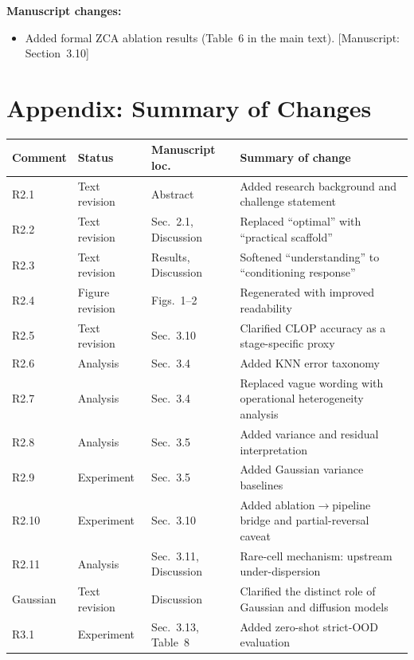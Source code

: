 \documentclass[11pt,letterpaper]{article}
\newcommand{\msref}[1]{\textcolor{blue!60!black}{\textsf{[Manuscript: #1]}}}
\begin{document}
\noindent\textbf{Manuscript changes:}
\begin{itemize}
  \item Added formal ZCA ablation results (Table~6 in the main text). \msref{Section~3.10}
\end{itemize}


\newpage

\section*{Appendix: Summary of Changes}

\small
\begin{longtable}{@{}p{1.6cm}p{2.8cm}p{3.2cm}p{5.5cm}@{}}
\toprule
\textbf{Comment} & \textbf{Status} & \textbf{Manuscript loc.} & \textbf{Summary of change} \\
\midrule
\endhead
R2.1 & Text revision & Abstract & Added research background and challenge statement \\
R2.2 & Text revision & Sec.~2.1, Discussion & Replaced ``optimal'' with ``practical scaffold'' \\
R2.3 & Text revision & Results, Discussion & Softened ``understanding'' to ``conditioning response'' \\
R2.4 & Figure revision & Figs.~1--2 & Regenerated with improved readability \\
R2.5 & Text revision & Sec.~3.10 & Clarified CLOP accuracy as a stage-specific proxy \\
R2.6 & Analysis & Sec.~3.4 & Added KNN error taxonomy \\
R2.7 & Analysis & Sec.~3.4 & Replaced vague wording with operational heterogeneity analysis \\
R2.8 & Analysis & Sec.~3.5 & Added variance and residual interpretation \\
R2.9 & Experiment & Sec.~3.5 & Added Gaussian variance baselines \\
R2.10 & Experiment & Sec.~3.10 & Added ablation$\to$pipeline bridge and partial-reversal caveat \\
R2.11 & Analysis & Sec.~3.11, Discussion & Rare-cell mechanism: upstream under-dispersion \\
Gaussian & Text revision & Discussion & Clarified the distinct role of Gaussian and diffusion models \\
R3.1 & Experiment & Sec.~3.13, Table~8 & Added zero-shot strict-OOD evaluation \\

\end{longtable}
\end{document}
